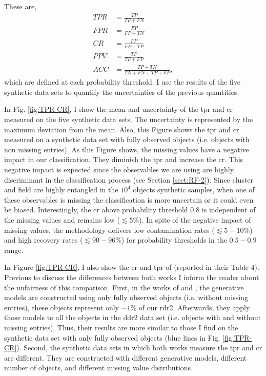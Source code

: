 These are,
\begin{align}
TPR &= \frac{TP}{TP+FN} \nonumber \\
FPR &= \frac{FP}{FP+TN} \nonumber \\
CR   &= \frac{FP}{FP+TP} \nonumber \\
PPV &= \frac{TP}{TP+FP} \nonumber \\
ACC &= \frac{TP+TN}{TN+FN+TP+FP},\nonumber
\end{align}
which are defined at each probability threshold. I use the results of the five synthetic data sets to quantify the uncertainties of the previous quantities. 

In Fig. \ref{fig:TPR-CR}, I show the mean and uncertainty of the \gls{tpr} and \gls{cr} measured on the five synthetic data sets. The uncertainty is represented by the maximum deviation from the mean. Also, this Figure shows the \gls{tpr} and \gls{cr} measured on a synthetic data set with fully observed objects (i.e. objects with non missing entries). As this Figure shows, the missing values have a negative impact in our classification. They diminish the \gls{tpr}  and increase the \gls{cr}. This negative impact is expected since the observables we are using are highly discriminant in the classification process (see Section \ref{sect:RF-2}). Since cluster and field are highly entangled in the $10^4$ objects synthetic samples, when one of these observables is missing the classification is more uncertain or it could even be biased. Interestingly, the \gls{cr} above probability threshold 0.8 is independent of the missing values and remains low ($\lesssim 5\%$). In spite of the negative impact of missing values, the methodology delivers low contamination rates ($\lesssim 5-10\%$) and high recovery rates ($\lesssim 90-96\%$) for probability thresholds in the $0.5-0.9$ range. 

In Figure \ref{fig:TPR-CR}, I also show the \gls{cr} and \gls{tpr} of \citet{Sarro2014} (reported in their Table 4). Previous to discuss the differences between both works I inform the reader about the unfairness of this comparison. First, in the works of \citet{Sarro2014} and \citet{Bouy2015}, the generative models are constructed using only fully observed objects (i.e. without missing entries), these objects represent only  $\sim 1\%$ of our \gls{rdr2}. Afterwards, they apply those models to all the objects in the \gls{ddr2} data set (i.e. objects with and without missing entries). Thus, their results are more similar to those I find on the synthetic data set with only fully observed objects (blue lines in Fig. \ref{fig:TPR-CR}). Second, the synthetic data sets in which both works measure the \gls{tpr} and \gls{cr} are different. They are constructed with different generative models, different number of objects, and different missing value distributions.

